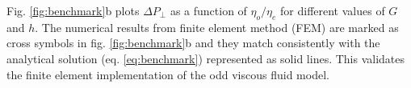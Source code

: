 \documentclass[%
 amsmath,amssymb,
 aps,
10.5pt]{revtex4-2}
\begin{document}
Fig. \ref{fig:benchmark}b plots $\Delta P_{\perp}$ as a function of $\eta_o/\eta_e$ for different values of $G$ and $h$. The numerical results from finite element method (FEM) are marked as cross symbols in fig. \ref{fig:benchmark}b  and they match consistently with the analytical solution (eq. \ref{eq:benchmark}) represented as solid lines. This validates the finite element implementation of the odd viscous fluid model.









%
%
\end{document}
